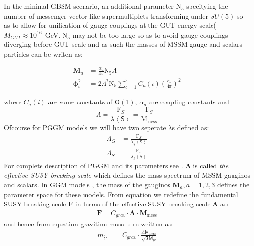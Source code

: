 {In the minimal GBSM scenario, an additional parameter  $\mathrm{N_{5}}$ specitying the number of messenger vector-like supermultiplets transforming under $SU(5)$ so as to allow for unification of gauge couplings at the GUT energy scale($M_{GUT} \approx 10^{16}$~GeV. $\mathrm{N_{5}}$ may not be too large so as to avoid gauge couplings diverging before GUT scale and as such the masses of MSSM gauge and scalars particles can be writen as:

\begin{align}\label{MSSMMasses}
\mathbf{M}_{a} &= \frac{\alpha_{a}}{4\pi}\mathrm{N_{5}}\Lambda \\ 
\mathbf{\phi}^{2}_{i} &= 2\Lambda^{2}\mathrm{N_{5}}\sum_{a=1}^{3}C_{a}(i) ( \frac{\alpha_{a}}{4\pi})^{2}
\end{align}

where $C_{a}(i)$ are some constants of $\mathsf{O}(1)$, $\alpha_{a}$ are coupling constants and 
\begin{equation}\label{Lambda}
\Lambda = \frac{\mathrm{F}_{S}}{\lambda \left\langle \mathsf{S} \right\rangle } = \frac{\mathrm{F}_{S}}{\mathrm{M}_{\mbox{mess}}}
\end{equation} 
Ofcourse for PGGM models we will have two seperate $\lambda$s defined as:
\begin{align}\label{Lambdap}
\Lambda_{G} &= \frac{\mathrm{F}_{S}}{\lambda_{q} \left\langle \mathsf{S} \right\rangle } \\
\Lambda_{S} &= \frac{\mathrm{F}_{S}}{\lambda_{\ell} \left\langle \mathsf{S} \right\rangle } 
\end{align}
For complete description of PGGM and its parameters see \cite{khoze}.
$\mathbf{\Lambda}$ is called \textit{the effective SUSY breaking scale} which defines the mass spectrum of MSSM gauginos and scalars.
In GGM models \cite{MDINE,MDINE1,MDINE2}, the mass of the gauginos $\mathbf{M}_{a}, a=1,2,3$ defines the parameter space for these models.
From equation \label{lt} we redefine the fundamental SUSY breaking scale $\mathrm{F}$ in terms of the effective SUSY breaking scale $\mathbf{\Lambda}$ as:
\begin{align}\label{scale}
\mathbf{F} = C_{grav}\cdot \mathbf{\Lambda}\cdot\mathbf{M}_{\mbox{mess}} 
\end{align}
and hence from equation \label{ } gravitino mass is re-written as:
\begin{align}\label{gmass}
m_{\tilde{G}} &= C_{grav}\cdot \frac{\Lambda\mathsf{M}_{\mbox{mess}}}{\sqrt{3}\mathsf{M}_{pl}}
\end{align}

}
